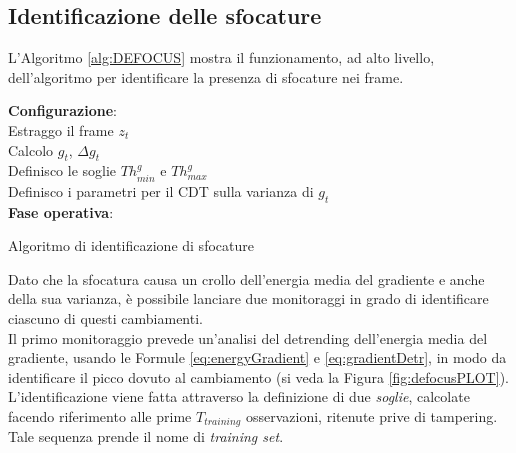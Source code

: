 \subsection{Identificazione delle sfocature}
L'Algoritmo \ref{alg:DEFOCUS} mostra il funzionamento, ad alto livello, dell'algoritmo per identificare la presenza di sfocature nei frame.
\begin{algorithm}[t]
	\LinesNumbered
	\textbf{Configurazione}:\\
	 
	{	 Estraggo il frame $z_t$ \\
		 Calcolo $g_t$, $\Delta g_t$ \\
	}
	 Definisco le soglie $Th_{min}^g$ e $Th_{max}^g$\\
	 Definisco i parametri per il CDT sulla varianza di $g_t$\\
	\textbf{Fase operativa}:\\
	    
	\caption{Algoritmo di identificazione di sfocature}
	\label{alg:DEFOCUS}
\end{algorithm}
Dato che la sfocatura causa un crollo dell'energia media del gradiente e anche della sua varianza, \`e possibile lanciare due monitoraggi in grado di identificare ciascuno di questi cambiamenti.\\
Il primo monitoraggio prevede un'analisi del detrending dell'energia media del gradiente, usando le Formule \eqref{eq:energyGradient} e \eqref{eq:gradientDetr}, in modo da identificare il picco dovuto al cambiamento (si veda la Figura \ref{fig:defocusPLOT}).
L'identificazione viene fatta attraverso la definizione di due \textit{soglie}, calcolate facendo riferimento alle prime $T_{training}$ osservazioni, ritenute prive di tampering.
Tale sequenza prende il nome di \textit{training set}.
